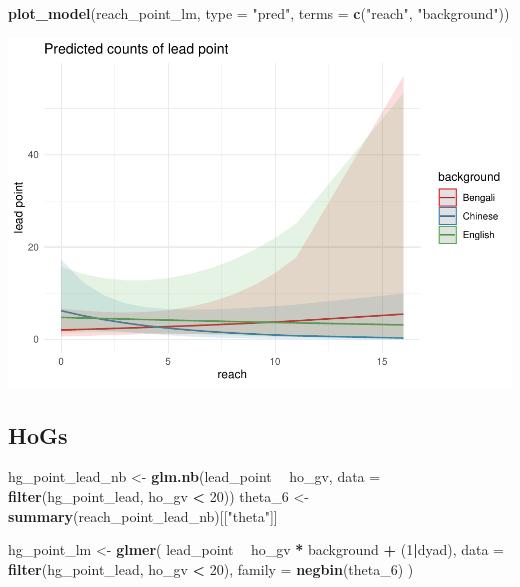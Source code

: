 \documentclass[]{article}
\newenvironment{Shaded}{\begin{snugshade}}{\end{snugshade}}
\newcommand{\DataTypeTok}[1]{\textcolor[rgb]{0.13,0.29,0.53}{#1}}
\newcommand{\DecValTok}[1]{\textcolor[rgb]{0.00,0.00,0.81}{#1}}
\newcommand{\KeywordTok}[1]{\textcolor[rgb]{0.13,0.29,0.53}{\textbf{#1}}}
\newcommand{\NormalTok}[1]{#1}
\newcommand{\OperatorTok}[1]{\textcolor[rgb]{0.81,0.36,0.00}{\textbf{#1}}}
\newcommand{\StringTok}[1]{\textcolor[rgb]{0.31,0.60,0.02}{#1}}
\begin{document}
\begin{Shaded}
\begin{Highlighting}[]
\KeywordTok{plot_model}\NormalTok{(reach_point_lm, }\DataTypeTok{type =} \StringTok{"pred"}\NormalTok{, }\DataTypeTok{terms =} \KeywordTok{c}\NormalTok{(}\StringTok{"reach"}\NormalTok{, }\StringTok{"background"}\NormalTok{))}
\end{Highlighting}
\end{Shaded}

\includegraphics{supplement_files/figure-latex/reach-point-plot-1.pdf}

\hypertarget{hogs}{%
\subsection{HoGs}\label{hogs}}

\begin{Shaded}
\begin{Highlighting}[]
\NormalTok{hg_point_lead_nb <-}\StringTok{ }\KeywordTok{glm.nb}\NormalTok{(lead_point }\OperatorTok{~}\StringTok{ }\NormalTok{ho_gv, }\DataTypeTok{data =} \KeywordTok{filter}\NormalTok{(hg_point_lead, ho_gv }\OperatorTok{<}\StringTok{ }\DecValTok{20}\NormalTok{))}
\NormalTok{theta_}\DecValTok{6}\NormalTok{ <-}\StringTok{ }\KeywordTok{summary}\NormalTok{(reach_point_lead_nb)[[}\StringTok{"theta"}\NormalTok{]]}

\NormalTok{hg_point_lm <-}\StringTok{ }\KeywordTok{glmer}\NormalTok{(}
\NormalTok{  lead_point }\OperatorTok{~}
\StringTok{    }\NormalTok{ho_gv }\OperatorTok{*}
\StringTok{    }\NormalTok{background }\OperatorTok{+}
\StringTok{    }\NormalTok{(}\DecValTok{1}\OperatorTok{|}\NormalTok{dyad),}
  \DataTypeTok{data =} \KeywordTok{filter}\NormalTok{(hg_point_lead, ho_gv }\OperatorTok{<}\StringTok{ }\DecValTok{20}\NormalTok{),}
  \DataTypeTok{family =} \KeywordTok{negbin}\NormalTok{(theta_}\DecValTok{6}\NormalTok{)}
\NormalTok{)}
\end{Highlighting}
\end{Shaded}
\end{document}
